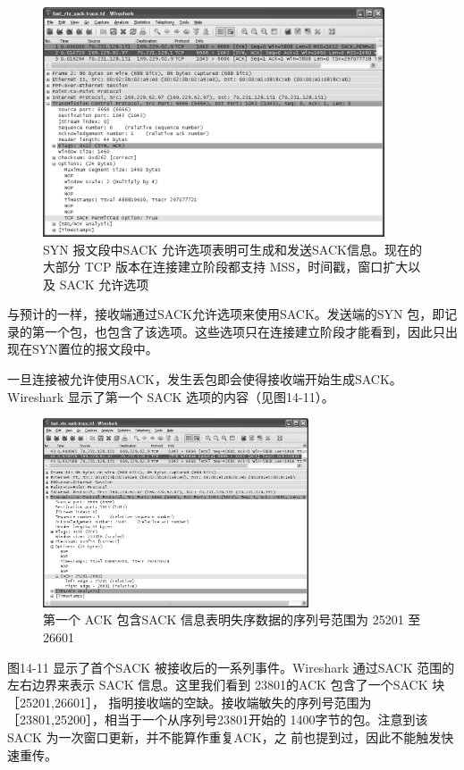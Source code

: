 \begin{figure}[!htb]
    \centering
	\includegraphics[width=0.9\textwidth]{imgs/14/14-10.png}
	\caption{SYN 报文段中SACK 允许选项表明可生成和发送SACK信息。现在的大部分 TCP 版本在连接建立阶段都支持 MSS，时间戳，窗口扩大以及 SACK 允许选项}
\end{figure}

与预计的一样，接收端通过SACK允许选项来使用SACK。发送端的SYN 包，即记录的第一个包，也包含了该选项。这些选项只在连接建立阶段才能看到，因此只出现在SYN置位的报文段中。

一旦连接被允许使用SACK，发生丢包即会使得接收端开始生成SACK。Wireshark 显示了第一个 SACK 选项的内容（见图14-11）。

\begin{figure}[!htb]
    \centering
	\includegraphics[width=0.7\textwidth]{imgs/14/14-11.png}
	\caption{第一个 ACK 包含SACK 信息表明失序数据的序列号范围为 25201 至 26601}
\end{figure}

图14-11 显示了首个SACK 被接收后的一系列事件。Wireshark 通过SACK 范围的左右边界来表示 SACK 信息。这里我们看到 23801的ACK 包含了一个SACK 块［25201,26601］，
指明接收端的空缺。接收端敏失的序列号范围为［23801,25200］，相当于一个从序列号23801开始的 1400字节的包。注意到该 SACK 为一次窗口更新，并不能算作重复ACK，之
前也提到过，因此不能触发快速重传。

